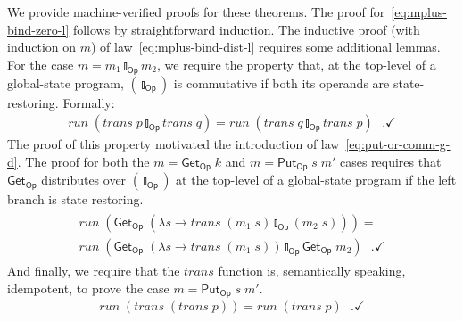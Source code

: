 \documentclass{llncs}
\newcommand{\Conid}[1]{\mathit{#1}}
\newcommand{\Varid}[1]{\mathit{#1}}
\let\Varid\mathit
\let\Conid\mathsf
\begin{document}
We provide machine-verified proofs for these theorems.
The proof for~\eqref{eq:mplus-bind-zero-l} follows by straightforward induction.
The inductive proof (with induction on \ensuremath{\Varid{m}}) of law~\eqref{eq:mplus-bind-dist-l}
requires some additional lemmas.
For the case \ensuremath{\Varid{m}\mathrel{=}\Varid{m}_{1}\mathbin{\talloblong}_\Conid{Op}\Varid{m}_{2}}, we require the property that, at the top-level
of a global-state program, \ensuremath{(\talloblong_\Conid{Op})} is commutative if both its operands are
state-restoring.
Formally:
\begin{align}
  \ensuremath{\Varid{run}\;(\Varid{trans}\;\Varid{p}\mathbin{\talloblong}_\Conid{Op}\Varid{trans}\;\Varid{q})} = \ensuremath{\Varid{run}\;(\Varid{trans}\;\Varid{q}\mathbin{\talloblong}_\Conid{Op}\Varid{trans}\;\Varid{p})}\mbox{~~.} \checkmark
\end{align}
The proof of this property motivated the introduction of
law~\eqref{eq:put-or-comm-g-d}.
The proof for both the \ensuremath{\Varid{m}\mathrel{=}\Conid{Get}_\Conid{Op}\;\Varid{k}} and \ensuremath{\Varid{m}\mathrel{=}\Conid{Put}_\Conid{Op}\;\Varid{s}\;\Varid{m'}} cases requires that \ensuremath{\Conid{Get}_\Conid{Op}}
distributes
over \ensuremath{(\talloblong_\Conid{Op})} at the top-level of a global-state program if the left branch is
state restoring.
\begin{align}
\begin{split}
\ensuremath{\Varid{run}\;(\Conid{Get}_\Conid{Op}\;(\lambda \Varid{s}\to \Varid{trans}\;(\Varid{m}_{1}\;\Varid{s})\mathbin{\talloblong}_\Conid{Op}(\Varid{m}_{2}\;\Varid{s})))} = \\
\ensuremath{\Varid{run}\;(\Conid{Get}_\Conid{Op}\;(\lambda \Varid{s}\to \Varid{trans}\;(\Varid{m}_{1}\;\Varid{s}))\mathbin{\talloblong}_\Conid{Op}\Conid{Get}_\Conid{Op}\;\Varid{m}_{2})} \label{eq:get-ret-mplus-g}\mbox{~~.} \checkmark
\end{split}
\end{align}
And finally, we require that the \ensuremath{\Varid{trans}} function is, semantically speaking,
idempotent, to prove the case \ensuremath{\Varid{m}\mathrel{=}\Conid{Put}_\Conid{Op}\;\Varid{s}\;\Varid{m'}}.
\begin{align}
\ensuremath{\Varid{run}\;(\Varid{trans}\;(\Varid{trans}\;\Varid{p}))\mathrel{=}\Varid{run}\;(\Varid{trans}\;\Varid{p})} \label{eq:run-trans-trans} \mbox{~~.} \checkmark
\end{align}
\end{document}
